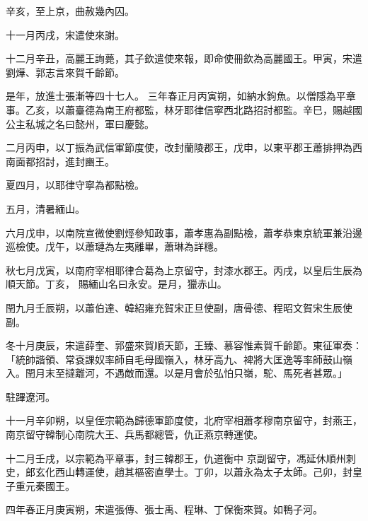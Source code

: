 \begin{pinyinscope}
 辛亥，至上京，曲赦幾內囚。



 十一月丙戌，宋遣使來謝。



 十二月辛丑，高麗王詢薨，其子欽遣使來報，即命使冊欽為高麗國王。甲寅，宋遣劉燁、郭志言來賀千齡節。



 是年，放進士張漸等四十七人。
 三年春正月丙寅朔，如納水鉤魚。以僧隱為平章事。乙亥，以蕭臺德為南王府都監，林牙耶律信寧西北路招討都監。辛巳，賜越國公主私城之名曰懿州，軍曰慶懿。



 二月丙申，以丁振為武信軍節度使，改封蘭陵郡王，戊申，以東平郡王蕭排押為西南面都招討，進封豳王。



 夏四月，以耶律守寧為都點檢。



 五月，清暑緬山。



 六月戊申，以南院宣微使劉烴參知政事，蕭孝惠為副點檢，蕭孝恭東京統軍兼沿邊巡檢使。戊午，以蕭璉為左夷離畢，蕭琳為詳穩。



 秋七月戊寅，以南府宰相耶律合葛為上京留守，封漆水郡王。丙戌，以皇后生辰為順天節。丁亥，
 賜緬山名曰永安。是月，獵赤山。



 閏九月壬辰朔，以蕭伯達、韓紹雍充賀宋正旦使副，唐骨德、程昭文賀宋生辰使副。



 冬十月庚辰，宋遣薛奎、郭盛來賀順天節，王臻、慕容惟素賀千齡節。東征軍奏：「統帥諧領、常袞課奴率師自毛母國嶺入，林牙高九、裨將大匡逸等率師鼓山嶺入。閏月末至撻離河，不遇敵而還。以是月會於弘怕只嶺，駝、馬死者甚眾。」



 駐蹕遼河。



 十一月辛卯朔，以皇侄宗範為歸德軍節度使，北府宰相蕭孝穆南京留守，封燕王，南京留守韓制心南院大王、兵馬都總管，仇正燕京轉運使。



 十二月壬戌，以宗範為平章事，封三韓郡王，仇道衡中
 京副留守，馮延休順州刺史，郎玄化西山轉運使，趙其樞密直學士。丁卯，以蕭永為太子太師。己卯，封皇子重元秦國王。



 四年春正月庚寅朔，宋遣張傳、張士禹、程琳、丁保衡來賀。如鴨子河。




\end{pinyinscope}
